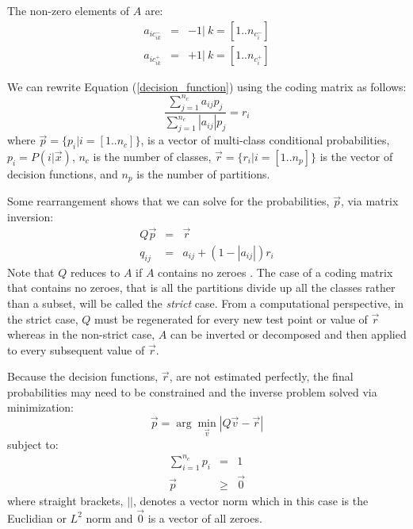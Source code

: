 \documentclass{article}
\newenvironment{eqnarraynon}{\begin{eqnarray*}}{\end{eqnarray*}}
\begin{document}
The non-zero elements of $A$ are:
\begin{eqnarraynon}
	a_{ic_{ik}^-} & = & -1 | ~k = [1..n_{c_i^-}]\\
a_{ic_{ik}^+} & = & +1 | ~k=[1..n_{c_i^+}]
\end{eqnarraynon}

We can rewrite Equation (\ref{decision_function}) using the coding 
matrix as follows:
\begin{equation}
	\frac{\sum_{j=1}^{n_c} a_{ij} p_j}{\sum_{j=1}^{n_c} |a_{ij}| p_j} = r_i
	\label{non_hier}
\end{equation}
where $\vec p=\lbrace p_i | i=[1..n_c]\rbrace$, 
is a vector of multi-class conditional probabilities, $p_i=P(i|\vec x)$, 
$n_c$ is the number of classes,
$\vec r=\lbrace r_i| i=[1..n_p]\rbrace$ 
is the vector of decision functions,
and
$n_p$ is the number of partitions.

Some rearrangement shows that
we can solve for the probabilities, $\vec p$, via matrix inversion:
\begin{eqnarray}
	Q \vec p & = & \vec r \label{basic_system}\\
	q_{ij} & = & a_{ij} + (1-|a_{ij}|) r_i 
	\label{matrix_equation2}
\end{eqnarray}
Note that $Q$ reduces to $A$ if $A$ contains no zeroes \citep{Kong_Dietterich1997}.
The case of a coding matrix that contains no zeroes, that is all the partitions divide up all the
classes rather than a subset, will be called the {\it strict} case.
From a computational perspective, in the strict case,
$Q$ must be regenerated for every new test point or value of $\vec r$ 
whereas in the non-strict case, $A$ can be inverted or decomposed and then
applied to every subsequent value of $\vec r$.

Because the decision functions, $\vec r$, are not estimated perfectly,
the final probabilities may need to be constrained and the inverse
problem solved via minimization:
\begin{equation}
	\vec p = \arg \min_{\vec v} | Q \vec v - \vec r | \label{minimization_problem}
\end{equation}
subject to:
\begin{eqnarray}
	\sum_{i=1}^{n_c} p_i & = & 1 \label{normalization}\\
	\vec p & \ge & \vec 0 \label{nonnegative}
\end{eqnarray}
where straight brackets, $||$, denotes a vector norm which  
in this case is the Euclidian or $L^2$ norm and
$\vec 0$ is a vector of all zeroes.
\end{document}
